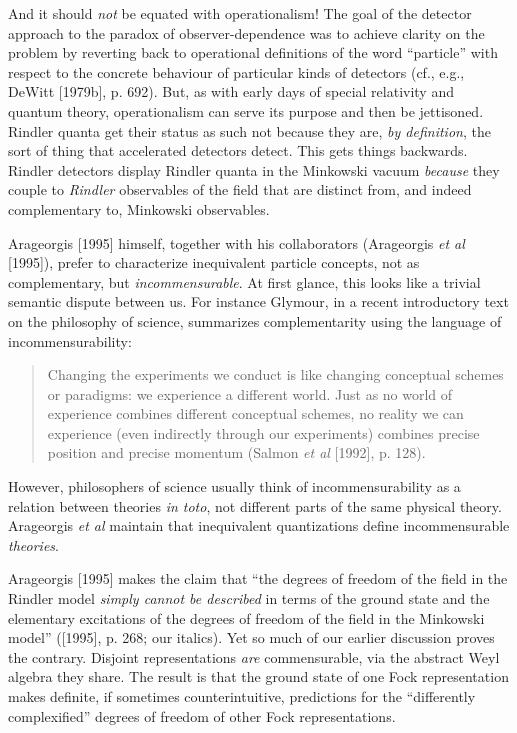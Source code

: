 \documentclass[12pt]{article}
\theoremstyle{remark}
\theoremstyle{definition}
\begin{document}
 And it should \emph{not} be equated with operationalism!  The goal of
 the detector approach to the paradox of observer-dependence was to
 achieve clarity on the problem by reverting back to operational
 definitions of the word ``particle'' with respect to the concrete
 behaviour of particular kinds of detectors (cf., e.g., DeWitt
 [1979b], p. 692).  But, as with early days of special relativity and
 quantum theory, operationalism can serve its purpose and then be
 jettisoned.  Rindler quanta get their status as such not because they
 are, \emph{by definition}, the sort of thing that accelerated
 detectors detect.  This gets things backwards. Rindler detectors
 display Rindler quanta in the Minkowski vacuum \emph{because} they
 couple to \emph{Rindler} observables of the field that are distinct
 from, and indeed complementary to, Minkowski observables.
 
 Arageorgis [1995]  himself, together with his collaborators 
(Arageorgis \emph{et al} [1995]), prefer to
 characterize inequivalent particle 
concepts, not as complementary, but \emph{incommensurable}.  At first 
glance, this looks like a trivial semantic dispute between us.  
For instance Glymour, in a recent introductory 
text on the philosophy of science, summarizes complementarity 
using the language of incommensurability: 
\begin{quote}
Changing the
experiments we conduct is like changing conceptual schemes or paradigms: we
experience a different world. Just as no world of experience combines
different conceptual schemes, no reality we can experience (even indirectly
through our experiments) combines precise position and precise 
momentum (Salmon \emph{et al} [1992], p.
128). \end{quote}
However,
philosophers of science usually think of incommensurability as a 
relation between theories \emph{in toto}, not different parts of the same 
physical theory.  Arageorgis \emph{et al} maintain that inequivalent 
quantizations define incommensurable \emph{theories}.     

Arageorgis [1995] makes the claim that ``the degrees of freedom of the field in the Rindler model
\emph{simply cannot be described} in terms of the ground state and the elementary
excitations of the degrees of freedom of the field in the Minkowski 
model'' ([1995], p. 268; our italics).  Yet so much of our earlier 
discussion proves the contrary.  Disjoint representations 
\emph{are} commensurable, via the abstract Weyl algebra they share.  
The result is that the ground state of one Fock representation makes
 definite, if sometimes counterintuitive, predictions for the
  ``differently complexified'' degrees of freedom of other Fock 
 representations.
 
\end{document}
